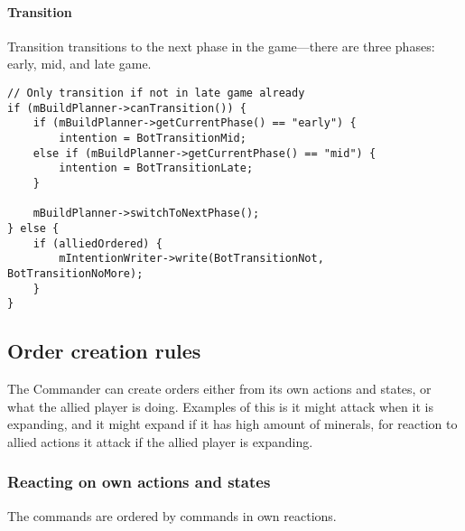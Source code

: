\paragraph{Transition}
Transition transitions to the next phase in the game—there are three phases: early, mid, and late game.
\begin{lstlisting}[label={lst:order_transition},caption={Pseudo-code for transition command}]
// Only transition if not in late game already
if (mBuildPlanner->canTransition()) {
	if (mBuildPlanner->getCurrentPhase() == "early") {
		intention = BotTransitionMid;
	else if (mBuildPlanner->getCurrentPhase() == "mid") {
		intention = BotTransitionLate;
	}

	mBuildPlanner->switchToNextPhase();
} else {
	if (alliedOrdered) {
		mIntentionWriter->write(BotTransitionNot, BotTransitionNoMore);
	}
}
\end{lstlisting}

\subsection{Order creation rules}
The Commander can create orders either from its own actions and states, or what the allied player is doing. Examples of this is it might attack when it is expanding, and it might expand if it has high amount of minerals, for reaction to allied actions it attack if the allied player is expanding.

\subsubsection{Reacting on own actions and states}
The commands are ordered by commands in own reactions.

